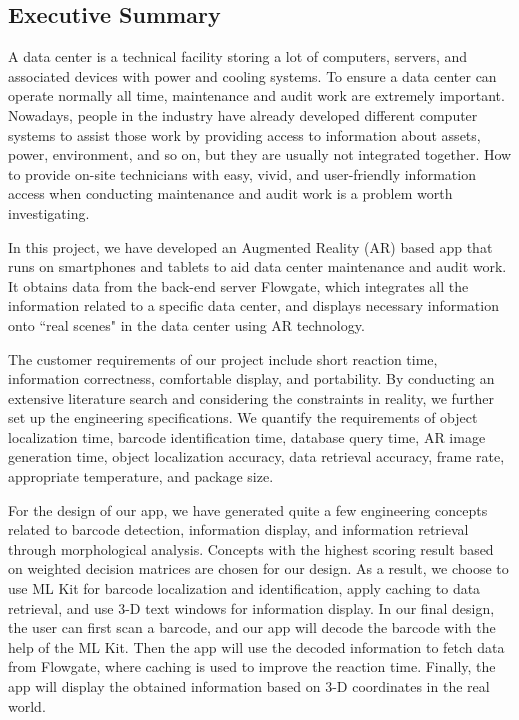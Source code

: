 \documentclass[11pt,a4paper]{article}
\begin{document}
\begin{onehalfspace}
\section*{Executive Summary}
A data center is a technical facility storing a lot of computers, servers, and associated devices with power and cooling systems. To ensure a data center can operate normally all time, maintenance and audit work are extremely important. Nowadays, people in the industry have already developed different computer systems to assist those work by providing access to information about assets, power, environment, and so on, but they are usually not integrated together. How to provide on-site technicians with easy, vivid, and user-friendly information access when conducting maintenance and audit work is a problem worth investigating.

In this project, we have developed an Augmented Reality (AR) based app that runs on smartphones and tablets to aid data center maintenance and audit work. It obtains data from the back-end server Flowgate, which integrates all the information related to a specific data center, and displays necessary information onto ``real scenes" in the data center using AR technology.

The customer requirements of our project include short reaction time, information correctness, comfortable display, and portability. By conducting an extensive literature search and considering the constraints in reality, we further set up the engineering specifications. We quantify the requirements of object localization time, barcode identification time, database query time, AR image generation time, object localization accuracy, data retrieval accuracy, frame rate, appropriate temperature, and package size.

For the design of our app, we have generated quite a few engineering concepts related to barcode detection, information display, and information retrieval through morphological analysis. Concepts with the highest scoring result based on weighted decision matrices are chosen for our design. As a result, we choose to use ML Kit for barcode localization and identification, apply caching to data retrieval, and use 3-D text windows for information display. In our final design, the user can first scan a barcode, and our app will decode the barcode with the help of the ML Kit. Then the app will use the decoded information to fetch data from Flowgate, where caching is used to improve the reaction time. Finally, the app will display the obtained information based on 3-D coordinates in the real world.


\end{onehalfspace}
\end{document}
